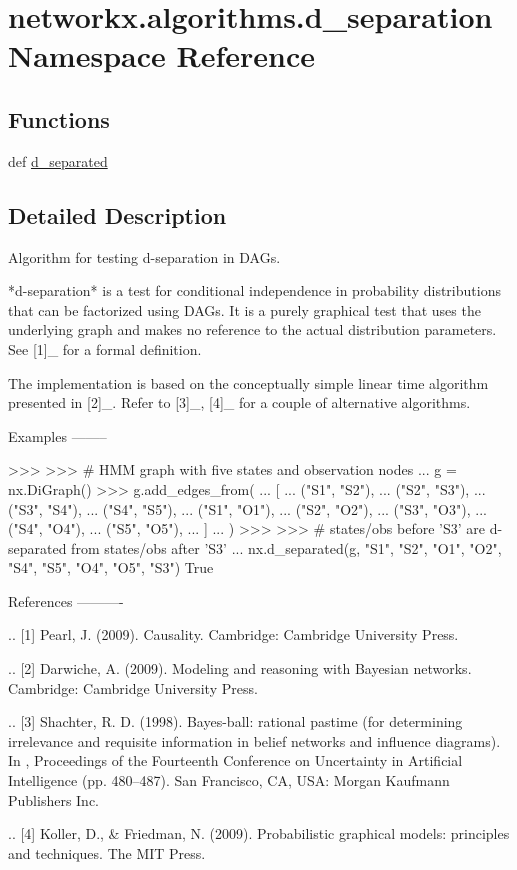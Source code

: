\hypertarget{namespacenetworkx_1_1algorithms_1_1d__separation}{}\section{networkx.\+algorithms.\+d\+\_\+separation Namespace Reference}
\label{namespacenetworkx_1_1algorithms_1_1d__separation}
\subsection*{Functions}
\begin{DoxyCompactItemize}
\item 
def \hyperlink{namespacenetworkx_1_1algorithms_1_1d__separation_aa0f55bef93e6fb193f076646796532c8}{d\+\_\+separated}
\end{DoxyCompactItemize}


\subsection{Detailed Description}
\begin{DoxyVerb}Algorithm for testing d-separation in DAGs.

*d-separation* is a test for conditional independence in probability
distributions that can be factorized using DAGs.  It is a purely
graphical test that uses the underlying graph and makes no reference
to the actual distribution parameters.  See [1]_ for a formal
definition.

The implementation is based on the conceptually simple linear time
algorithm presented in [2]_.  Refer to [3]_, [4]_ for a couple of
alternative algorithms.


Examples
--------

>>>
>>> # HMM graph with five states and observation nodes
... g = nx.DiGraph()
>>> g.add_edges_from(
...     [
...         ("S1", "S2"),
...         ("S2", "S3"),
...         ("S3", "S4"),
...         ("S4", "S5"),
...         ("S1", "O1"),
...         ("S2", "O2"),
...         ("S3", "O3"),
...         ("S4", "O4"),
...         ("S5", "O5"),
...     ]
... )
>>>
>>> # states/obs before 'S3' are d-separated from states/obs after 'S3'
... nx.d_separated(g, {"S1", "S2", "O1", "O2"}, {"S4", "S5", "O4", "O5"}, {"S3"})
True


References
----------

.. [1] Pearl, J.  (2009).  Causality.  Cambridge: Cambridge University Press.

.. [2] Darwiche, A.  (2009).  Modeling and reasoning with Bayesian networks. 
   Cambridge: Cambridge University Press.

.. [3] Shachter, R.  D.  (1998).
   Bayes-ball: rational pastime (for determining irrelevance and requisite
   information in belief networks and influence diagrams).
   In , Proceedings of the Fourteenth Conference on Uncertainty in Artificial
   Intelligence (pp.  480–487).
   San Francisco, CA, USA: Morgan Kaufmann Publishers Inc.

.. [4] Koller, D., & Friedman, N. (2009).
   Probabilistic graphical models: principles and techniques. The MIT Press.\end{DoxyVerb}
 

